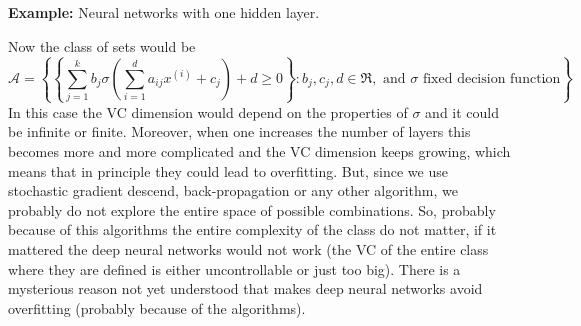 \documentclass[11pt, english]{article}
\newcommand{\su}[2]{\sum\limits_{#1}^{#2}}
\begin{document}
\textbf{Example:} Neural networks with one hidden layer. \\

Now the class of sets would be 
\begin{equation}
	\mathcal{A}=\left\{\left\{\su{j=1}{k} b_j \sigma\left(\su{i=1}{d}a_{ij}x^{(i)}+c_j\right)+d\geq 0\right\}:b_j,c_j,d\in\Re,\text{ and }\sigma \text{ fixed decision function}\right\}.
\end{equation}
In this case the VC dimension would depend on the properties of $\sigma$ and it could be infinite or finite. Moreover, when one increases the number of layers this becomes more and more complicated and the VC dimension keeps growing, which means that in principle they could lead to overfitting. But, since we use stochastic gradient descend, back-propagation or any other algorithm, we probably do not explore the entire space of possible combinations. So, probably because of this algorithms the entire complexity of the class do not matter, if it mattered the deep neural networks would not work (the VC of the entire class where they are defined is either uncontrollable or just too big). There is a mysterious reason not yet understood that makes deep neural networks avoid overfitting (probably because of the algorithms).\\%
\end{document}
